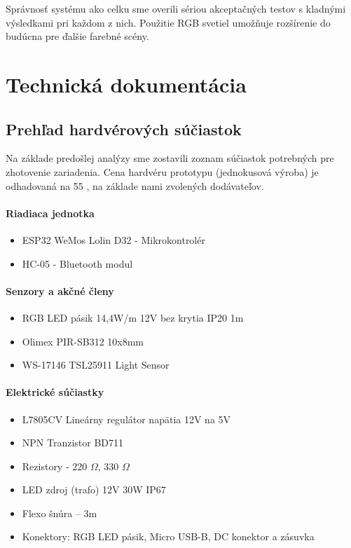 \documentclass[12pt, a4paper]{article}
\begin{document}
Správnosť systému ako celku sme overili sériou akceptačných testov s kladnými výsledkami pri každom z nich. Použitie RGB svetiel umožňuje rozšírenie do budúcna pre ďalšie farebné scény.

\printbibliography[title={Zoznam použitej literatúry}]

\section{Technická dokumentácia}
\subsection{Prehľad hardvérových súčiastok}
Na základe predošlej analýzy sme zostavili zoznam súčiastok potrebných pre zhotovenie zariadenia. Cena hardvéru prototypu (jednokusová výroba) je odhadovaná na 55 \texteuro, na základe nami zvolených dodávateľov.

\paragraph{Riadiaca jednotka}
\begin{itemize}
\itemsep0pt
\item ESP32 WeMos Lolin D32 - Mikrokontrolér
\item HC-05 - Bluetooth modul
\end{itemize}

\paragraph{Senzory a akčné členy}
\begin{itemize}
\itemsep0pt
\item RGB LED pásik 14,4W/m 12V bez krytia IP20 1m
\item Olimex PIR-SB312 10x8mm
\item WS-17146 TSL25911 Light Sensor
\end{itemize}

\paragraph{Elektrické súčiastky}
\begin{itemize}
\itemsep0pt
\item L7805CV Lineárny regulátor napätia 12V na 5V
\item NPN Tranzistor BD711
\item Rezistory - 220 $\Omega$, 330 $\Omega$
\item LED zdroj (trafo) 12V 30W IP67
\item Flexo šnúra – 3m
\item Konektory: RGB LED pásik, Micro USB-B, DC konektor a zásuvka
\end{itemize}
\end{document}
